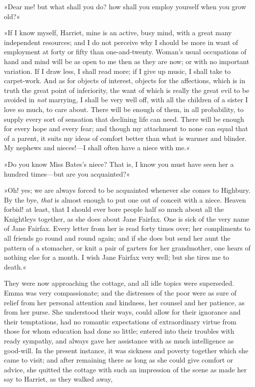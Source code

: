 »Dear me! but what shall you do? how shall you employ yourself when you grow old?«

»If I know myself, Harriet, mine is an active, busy mind, with a great many independent resources; and I do not perceive why I should be more in want of employment at forty or fifty than one-and-twenty. Woman's usual occupations of hand and mind will be as open to me then as they are now; or with no important variation. If I draw less, I shall read more; if I give up music, I shall take to carpet-work. And as for objects of interest, objects for the affections, which is in truth the great point of inferiority, the want of which is really the great evil to be avoided in \textit{not} marrying, I shall be very well off, with all the children of a sister I love so much, to care about. There will be enough of them, in all probability, to supply every sort of sensation that declining life can need. There will be enough for every hope and every fear; and though my attachment to none can equal that of a parent, it suits my ideas of comfort better than what is warmer and blinder. My nephews and nieces!—I shall often have a niece with me.«

»Do you know Miss Bates's niece? That is, I know you must have seen her a hundred times—but are you acquainted?«

»Oh! yes; we are always forced to be acquainted whenever she comes to Highbury. By the bye, \textit{that} is almost enough to put one out of conceit with a niece. Heaven forbid! at least, that I should ever bore people half so much about all the Knightleys together, as she does about Jane Fairfax. One is sick of the very name of Jane Fairfax. Every letter from her is read forty times over; her compliments to all friends go round and round again; and if she does but send her aunt the pattern of a stomacher, or knit a pair of garters for her grandmother, one hears of nothing else for a month. I wish Jane Fairfax very well; but she tires me to death.«

They were now approaching the cottage, and all idle topics were superseded. Emma was very compassionate; and the distresses of the poor were as sure of relief from her personal attention and kindness, her counsel and her patience, as from her purse. She understood their ways, could allow for their ignorance and their temptations, had no romantic expectations of extraordinary virtue from those for whom education had done so little; entered into their troubles with ready sympathy, and always gave her assistance with as much intelligence as good-will. In the present instance, it was sickness and poverty together which she came to visit; and after remaining there as long as she could give comfort or advice, she quitted the cottage with such an impression of the scene as made her say to Harriet, as they walked away,

